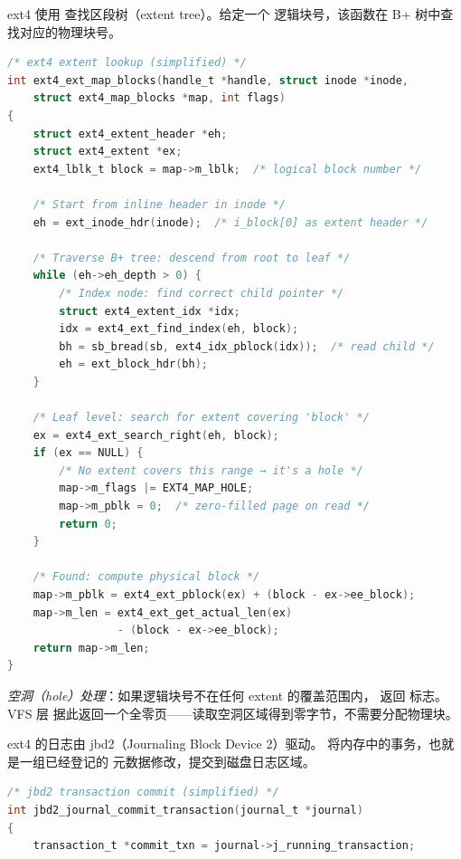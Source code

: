 \begin{filesystemlayout}
ext4 使用  查找区段树（extent tree）。给定一个
逻辑块号，该函数在 B+ 树中查找对应的物理块号。

\begin{lstlisting}[language=C]
/* ext4 extent lookup (simplified) */
int ext4_ext_map_blocks(handle_t *handle, struct inode *inode,
    struct ext4_map_blocks *map, int flags)
{
    struct ext4_extent_header *eh;
    struct ext4_extent *ex;
    ext4_lblk_t block = map->m_lblk;  /* logical block number */

    /* Start from inline header in inode */
    eh = ext_inode_hdr(inode);  /* i_block[0] as extent header */

    /* Traverse B+ tree: descend from root to leaf */
    while (eh->eh_depth > 0) {
        /* Index node: find correct child pointer */
        struct ext4_extent_idx *idx;
        idx = ext4_ext_find_index(eh, block);
        bh = sb_bread(sb, ext4_idx_pblock(idx));  /* read child */
        eh = ext_block_hdr(bh);
    }

    /* Leaf level: search for extent covering 'block' */
    ex = ext4_ext_search_right(eh, block);
    if (ex == NULL) {
        /* No extent covers this range → it's a hole */
        map->m_flags |= EXT4_MAP_HOLE;
        map->m_pblk = 0;  /* zero-filled page on read */
        return 0;
    }

    /* Found: compute physical block */
    map->m_pblk = ext4_ext_pblock(ex) + (block - ex->ee_block);
    map->m_len = ext4_ext_get_actual_len(ex)
                 - (block - ex->ee_block);
    return map->m_len;
}
\end{lstlisting}

\emph{空洞（hole）处理}：如果逻辑块号不在任何 extent 的覆盖范围内，
 返回  标志。VFS 层
据此返回一个全零页——读取空洞区域得到零字节，不需要分配物理块。


ext4 的日志由 jbd2（Journaling Block Device 2）驱动。
 将内存中的事务，也就是一组已经登记的
元数据修改，提交到磁盘日志区域。

\begin{lstlisting}[language=C]
/* jbd2 transaction commit (simplified) */
int jbd2_journal_commit_transaction(journal_t *journal)
{
    transaction_t *commit_txn = journal->j_running_transaction;


\end{lstlisting}
\end{filesystemlayout}
